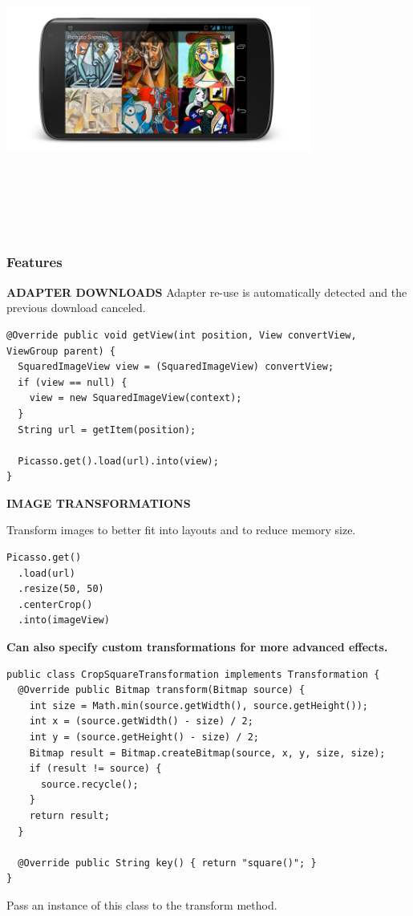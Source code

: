 \begin{center}
    \includegraphics[width=10cm,height=10cm,keepaspectratio]{Images/picassoex1.png}
\end{center}
\newpage

\subsubsection{Features}

\textbf{ADAPTER DOWNLOADS}\newline
Adapter re-use is automatically detected and the previous download canceled.
\begin{lstlisting}
@Override public void getView(int position, View convertView, ViewGroup parent) {
  SquaredImageView view = (SquaredImageView) convertView;
  if (view == null) {
    view = new SquaredImageView(context);
  }
  String url = getItem(position);

  Picasso.get().load(url).into(view);
}
\end{lstlisting}


\textbf{IMAGE TRANSFORMATIONS}\newline

Transform images to better fit into layouts and to reduce memory size.
\begin{lstlisting}
Picasso.get()
  .load(url)
  .resize(50, 50)
  .centerCrop()
  .into(imageView)
\end{lstlisting}
\textbf{Can also specify custom transformations for more advanced effects.}
\begin{lstlisting}
public class CropSquareTransformation implements Transformation {
  @Override public Bitmap transform(Bitmap source) {
    int size = Math.min(source.getWidth(), source.getHeight());
    int x = (source.getWidth() - size) / 2;
    int y = (source.getHeight() - size) / 2;
    Bitmap result = Bitmap.createBitmap(source, x, y, size, size);
    if (result != source) {
      source.recycle();
    }
    return result;
  }

  @Override public String key() { return "square()"; }
}
\end{lstlisting}
Pass an instance of this class to the transform method.
\newpage

